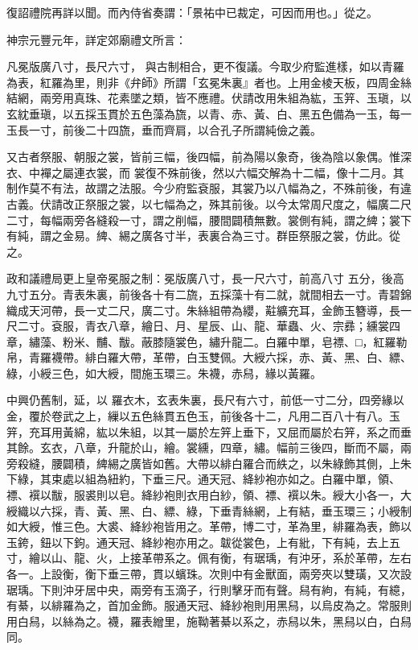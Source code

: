 \begin{pinyinscope}
 復詔禮院再詳以聞。而內侍省奏謂：「景祐中已裁定，可因而用也。」從之。



 神宗元豐元年，詳定郊廟禮文所言：



 凡冕版廣八寸，長尺六寸，
 與古制相合，更不復議。今取少府監進樣，如以青羅為表，紅羅為里，則非《弁師》所謂「玄冕朱裏』者也。上用金棱天板，四周金絲結網，兩旁用真珠、花素墜之類，皆不應禮。伏請改用朱組為紘，玉笄、玉瑱，以玄紞垂瑱，以五採玉貫於五色藻為旒，以青、赤、黃、白、黑五色備為一玉，每一玉長一寸，前後二十四旒，垂而齊肩，以合孔子所謂純儉之義。



 又古者祭服、朝服之裳，皆前三幅，後四幅，前為陽以象奇，後為陰以象偶。惟深衣、中襌之屬連衣裳，而
 裳復不殊前後，然以六幅交解為十二幅，像十二月。其制作莫不有法，故謂之法服。今少府監袞服，其裳乃以八幅為之，不殊前後，有違古義。伏請改正祭服之裳，以七幅為之，殊其前後。以今太常周尺度之，幅廣二尺二寸，每幅兩旁各縫殺一寸，謂之削幅，腰間闢積無數。裳側有純，謂之綼；裳下有純，謂之金易。綼、緆之廣各寸半，表裏合為三寸。群臣祭服之裳，仿此。從之。



 政和議禮局更上皇帝冕服之制：冕版廣八寸，長一尺六寸，前高八寸
 五分，後高九寸五分。青表朱裏，前後各十有二旒，五採藻十有二就，就間相去一寸。青碧錦織成天河帶，長一丈二尺，廣二寸。朱絲組帶為纓，黈纊充耳，金飾玉簪導，長一尺二寸。袞服，青衣八章，繪日、月、星辰、山、龍、華蟲、火、宗彞；纁裳四章，繡藻、粉米、黼、黻。蔽膝隨裳色，繡升龍二。白羅中單，皂褾、□，紅羅勒帛，青羅襪帶。緋白羅大帶，革帶，白玉雙佩。大綬六採，赤、黃、黑、白、縹、綠，小綬三色，如大綬，間施玉環三。朱襪，赤舄，緣以黃羅。



 中興仍舊制，延，以
 羅衣木，玄表朱裏，長尺有六寸，前低一寸二分，四旁緣以金，覆於卷武之上，繅以五色絲貫五色玉，前後各十二，凡用二百八十有八。玉笄，充耳用黃綿，紘以朱組，以其一屬於左笄上垂下，又屈而屬於右笄，系之而垂其餘。玄衣，八章，升龍於山，繪。裳纁，四章，繡。幅前三後四，斷而不屬，兩旁殺縫，腰闢積，綼緆之廣皆如舊。大帶以緋白羅合而紩之，以朱綠飾其側，上朱下綠，其束處以組為紐約，下垂三尺。通天冠、絳紗袍亦如之。白羅中單，領、
 褾、襈以黻，服裘則以皂。絳紗袍則衣用白紗，領、褾、襈以朱。綬大小各一，大綬織以六採，青、黃、黑、白、縹、綠，下垂青絲網，上有結，垂玉環三；小綬制如大綬，惟三色。大裘、絳紗袍皆用之。革帶，博二寸，革為里，緋羅為表，飾以玉銙，鈕以下鉤。通天冠、絳紗袍亦用之。韍從裳色，上有紕，下有純，去上五寸，繪以山、龍、火，上接革帶系之。佩有衡，有琚瑀，有沖牙，系於革帶，左右各一。上設衡，衡下垂三帶，貫以蠙珠。次則中有金獸面，兩旁夾以雙璜，又次設
 琚瑀。下則沖牙居中央，兩旁有玉滴子，行則擊牙而有聲。舄有絇，有純，有繶，有綦，以緋羅為之，首加金飾。服通天冠、絳紗袍則用黑舄，以烏皮為之。常服則用白舄，以絲為之。襪，羅表繒里，施靿著綦以系之，赤舄以朱，黑舄以白，白舄同。




\end{pinyinscope}
